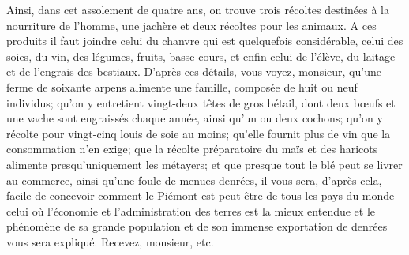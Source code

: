 Ainsi, dans cet assolement de quatre ans, on trouve trois récoltes destinées à la nourriture de l'homme, une jachère et deux récoltes\setcounter{page}{408} pour les animaux. A ces produits il faut joindre celui du chanvre qui est quelquefois considérable, celui des soies, du vin, des légumes, fruits, basse-cours, et enfin celui de l'élève, du laitage et de l'engrais des bestiaux.
D'après ces détails, vous voyez, monsieur, qu'une ferme de soixante arpens alimente une famille, composée de huit ou neuf individus; qu'on y entretient vingt-deux têtes de gros bétail, dont deux bœufs et une vache sont engraissés chaque année, ainsi qu'un ou deux cochons; qu'on y récolte pour vingt-cinq louis de soie au moins; qu'elle fournit plus de vin que la consommation n'en exige; que la récolte préparatoire du maïs et des haricots alimente presqu'uniquement les métayers; et que presque tout le blé peut se livrer au commerce, ainsi qu'une foule de menues denrées, il vous sera, d'après cela, facile de concevoir comment le Piémont est peut-être de tous les pays du monde celui où l'économie et l'administration des terres est la mieux entendue et le phénomène de sa grande population et de son immense exportation de denrées vous sera expliqué.
Recevez, monsieur, etc.